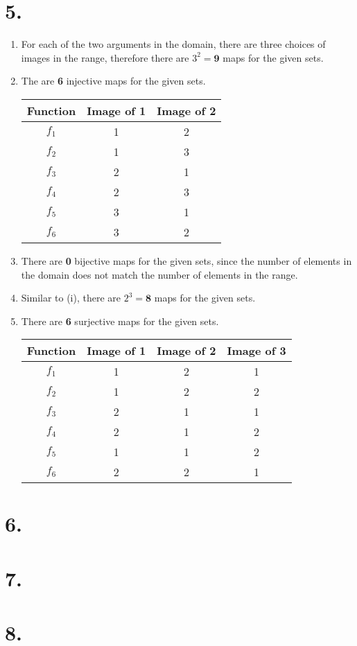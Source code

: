 \documentclass[12pt]{article}
\newcommand{\p}[1]{\item[\textnormal{(#1)}]}
\newenvironment{ps}
{\begin{enumerate}[leftmargin=0em, itemindent=1.5em]}
{\end{enumerate}}
\begin{document}
\section*{5.}
\begin{ps}

    \p{i} For each of the two arguments in the domain, there are three choices of images in the
    range, therefore there are \( 3^2 = \mathbf{9} \) maps for the given sets.

    \p{ii} The are \textbf{6} injective maps for the given sets.
        \begin{center}
        \begin{tabular}{|c|c|c|}
        \hline
        Function & Image of 1 & Image of 2 \\
        \hline
        $f_1$ & 1 & 2 \\
        $f_2$ & 1 & 3 \\
        $f_3$ & 2 & 1 \\
        $f_4$ & 2 & 3 \\
        $f_5$ & 3 & 1 \\
        $f_6$ & 3 & 2 \\
        \hline
        \end{tabular}
        \end{center}

    \p{iii} There are \textbf{0} bijective maps for the given sets, since the number of elements in
    the domain does not match the number of elements in the range.

    \p{iv} Similar to (i), there are \( 2^3 = \textbf{8} \) maps for the given sets. 

    \p{v} There are \textbf{6} surjective maps for the given sets.

        \begin{center}
        \begin{tabular}{|c|c|c|c|}
        \hline
        Function & Image of 1 & Image of 2 & Image of 3 \\
        \hline
        $f_1$ & 1 & 2 & 1 \\
        $f_2$ & 1 & 2 & 2 \\
        $f_3$ & 2 & 1 & 1 \\
        $f_4$ & 2 & 1 & 2 \\
        $f_5$ & 1 & 1 & 2 \\
        $f_6$ & 2 & 2 & 1 \\
        \hline
        \end{tabular}
        \end{center}

\end{ps}

\section*{6.}
\section*{7.}
\section*{8.}
\end{document}
